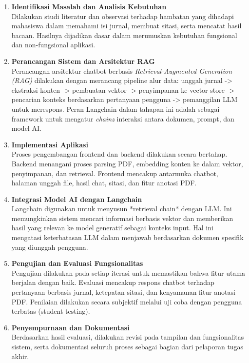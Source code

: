 \begin{enumerate}
  \item \textbf{Identifikasi Masalah dan Analisis Kebutuhan} \\
        Dilakukan studi literatur dan observasi terhadap hambatan yang dihadapi mahasiswa dalam memahami isi jurnal, membuat sitasi, serta mencatat hasil bacaan. Hasilnya dijadikan dasar dalam merumuskan kebutuhan fungsional dan non-fungsional aplikasi.

  \item \textbf{Perancangan Sistem dan Arsitektur RAG} \\
        Perancangan arsitektur chatbot berbasis \textit{Retrieval-Augmented Generation (RAG)} dilakukan dengan merancang pipeline alur data: unggah jurnal -> ekstraksi konten -> pembuatan vektor -> penyimpanan ke vector store -> pencarian konteks berdasarkan pertanyaan pengguna -> pemanggilan LLM untuk merespons. Peran Langchain dalam tahapan ini adalah sebagai framework untuk mengatur \textit{chainz} interaksi antara dokumen, prompt, dan model AI.

  \item \textbf{Implementasi Aplikasi} \\
        Proses pengembangan frontend dan backend dilakukan secara bertahap. Backend menangani proses parsing PDF, embedding konten ke dalam vektor, penyimpanan, dan retrieval. Frontend mencakup antarmuka chatbot, halaman unggah file, hasil chat, sitasi, dan fitur anotasi PDF.

  \item \textbf{Integrasi Model AI dengan Langchain} \\
        Langchain digunakan untuk menyusun *retrieval chain* dengan LLM. Ini memungkinkan sistem mencari informasi berbasis vektor dan memberikan hasil yang relevan ke model generatif sebagai konteks input. Hal ini mengatasi keterbatasan LLM dalam menjawab berdasarkan dokumen spesifik yang diunggah pengguna.

  \item \textbf{Pengujian dan Evaluasi Fungsionalitas} \\
        Pengujian dilakukan pada setiap iterasi untuk memastikan bahwa fitur utama berjalan dengan baik. Evaluasi mencakup respons chatbot terhadap pertanyaan berbasis jurnal, ketepatan sitasi, dan kenyamanan fitur anotasi PDF. Penilaian dilakukan secara subjektif melalui uji coba dengan pengguna terbatas (student testing).

  \item \textbf{Penyempurnaan dan Dokumentasi} \\
        Berdasarkan hasil evaluasi, dilakukan revisi pada tampilan dan fungsionalitas sistem, serta dokumentasi seluruh proses sebagai bagian dari pelaporan tugas akhir.
\end{enumerate}

